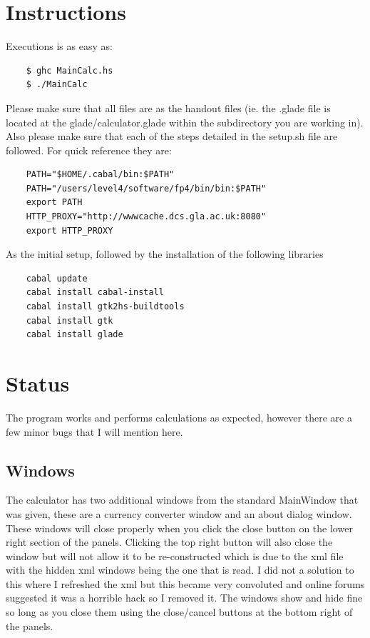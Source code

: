 \documentclass[12pt]{article} %
\begin{document}
\section{Instructions}
Executions is as easy as: 
\begin{verbatim}
	$ ghc MainCalc.hs
	$ ./MainCalc
\end{verbatim}

Please make sure that all files are as the handout files (ie. the .glade file is located at the glade/calculator.glade within the subdirectory you are working in). Also please make sure that each of the steps detailed in the setup.sh file are followed. For quick reference they are:

\begin{verbatim}
	PATH="$HOME/.cabal/bin:$PATH"
	PATH="/users/level4/software/fp4/bin/bin:$PATH"
	export PATH
	HTTP_PROXY="http://wwwcache.dcs.gla.ac.uk:8080"
	export HTTP_PROXY
\end{verbatim}

As the initial setup, followed by the installation of the following libraries

\begin{verbatim}
	cabal update
	cabal install cabal-install
	cabal install gtk2hs-buildtools
	cabal install gtk
	cabal install glade
\end{verbatim}
\newpage

\section{Status}

The program works and performs calculations as expected, however there are a few minor bugs that I will mention here.
\subsection{Windows}
\label{sec:Windows}
The calculator has two additional windows from the standard MainWindow that was given, these are a currency converter window and an about dialog window. These windows will close properly when you click the close button on the lower right section of the panels. Clicking the top right button will also close the window but will not allow it to be re-constructed which is due to the xml file with the hidden xml windows being the one that is read. I did not a solution to this where I refreshed the xml but this became very convoluted and online forums suggested it was a horrible hack so I removed it. The windows show and hide fine so long as you close them using the close/cancel buttons at the bottom right of the panels.
\end{document}
